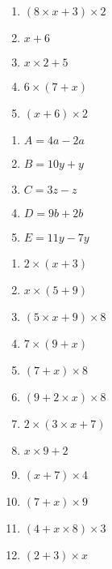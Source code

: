 \documentclass[11pt]{article}
\begin{document}
\begin{multicols}{2}
\begin{exercice}
\begin{multicols}{2}
\begin{enumerate}[itemsep=1em]
\item $(8 \times x + 3) \times 2$
\item $x + 6$
\item $x \times 2 + 5$
\item $6 \times (7 + x)$
\item $(x + 6) \times 2$
\end{enumerate}
\end{multicols}
\end{exercice}



\begin{exercice}[1][Factoriser]
\begin{enumerate}[itemsep=1em]
\item $A=4a-2a$
\item $B=10y+y$
\item $C=3z-z$
\item $D=9b+2b$
\item $E=11y-7y$
\end{enumerate}
\end{exercice}
\end{multicols}


\begin{exercice}[1][Distribuer]
\begin{multicols}{2}
\begin{enumerate}[itemsep=1em]
\item  $2 \times (x + 3)$ 
\item  $x \times (5 + 9)$ 
\item  $(5 \times x + 9) \times 8$ 
\item  $7 \times (9 + x)$ 
\item  $(7 + x) \times 8$ 
\item  $(9 + 2 \times x) \times 8$ 
\item  $2 \times (3 \times x + 7)$ 
\item  $x \times 9 + 2$ 
\item  $(x + 7) \times 4$ 
\item  $(7 + x) \times 9$ 
\item  $(4 + x \times 8) \times 3$ 
\item  $(2 + 3) \times x$ 
\end{enumerate}
\end{multicols}
\end{exercice}
\end{document}
